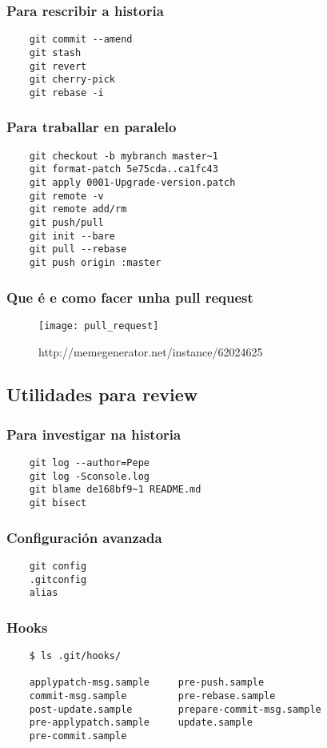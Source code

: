 \begin{frame}[fragile]
  \frametitle{Para rescribir a historia}
\begin{verbatim}
	git commit --amend
	git stash
	git revert
	git cherry-pick
	git rebase -i
\end{verbatim}
\end{frame}

\begin{frame}[fragile]
  \frametitle{Para traballar en paralelo}
\begin{verbatim}
	git checkout -b mybranch master~1
	git format-patch 5e75cda..ca1fc43
	git apply 0001-Upgrade-version.patch
	git remote -v
	git remote add/rm
	git push/pull
	git init --bare
	git pull --rebase
	git push origin :master
\end{verbatim}
\end{frame}

\begin{frame}
  \frametitle{Que é e como facer unha pull request}
  \begin{figure}[ht]
    \centering
    \texttt{[image: pull\_request]}
    \caption{http://memegenerator.net/instance/62024625}
  \end{figure}
\end{frame}

\subsection{Utilidades para review}
\label{subsec:Review}

\begin{frame}[fragile]
  \frametitle{Para investigar na historia}
\begin{verbatim}
	git log --author=Pepe
	git log -Sconsole.log
	git blame de168bf9~1 README.md
	git bisect
\end{verbatim}
\end{frame}

\begin{frame}[fragile]
  \frametitle{Configuración avanzada}
\begin{verbatim}
	git config
	.gitconfig
	alias
\end{verbatim}
\end{frame}

\begin{frame}[fragile]
  \frametitle{Hooks}
\begin{verbatim}
	$ ls .git/hooks/

	applypatch-msg.sample     pre-push.sample
	commit-msg.sample         pre-rebase.sample
	post-update.sample        prepare-commit-msg.sample
	pre-applypatch.sample     update.sample
	pre-commit.sample
\end{verbatim}
\end{frame}

